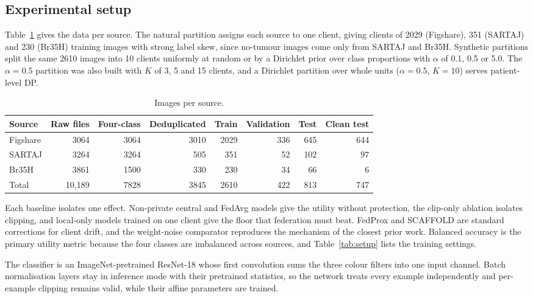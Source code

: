 \documentclass[preprint,12pt]{elsarticle}
\begin{document}
\subsection{Experimental setup}
Table~\ref{tab:data} gives the data per source. The natural partition assigns each source to one client, giving
clients of 2029 (Figshare), 351 (SARTAJ) and 230 (Br35H) training images with strong label skew, since no-tumour
images come only from SARTAJ and Br35H. Synthetic partitions split the same 2610 images into 10 clients uniformly at
random or by a Dirichlet prior over class proportions with $\alpha$ of 0.1, 0.5 or 5.0.\cite{hsu2019} The
$\alpha=0.5$ partition was also built with $K$ of 3, 5 and 15 clients, and a Dirichlet partition over whole units
($\alpha=0.5$, $K=10$) serves patient-level DP.

\begin{table}[htbp]
\caption{Images per source.}\label{tab:data}
\footnotesize\setlength{\tabcolsep}{4pt}
\begin{tabular*}{\linewidth}{@{\extracolsep{\fill}}lrrrrrrr@{}}
\toprule
Source & Raw files & Four-class & Deduplicated & Train & Validation & Test & Clean test\\
\midrule
Figshare & 3064 & 3064 & 3010 & 2029 & 336 & 645 & 644\\
SARTAJ & 3264 & 3264 & 505 & 351 & 52 & 102 & 97\\
Br35H & 3861 & 1500 & 330 & 230 & 34 & 66 & 6\\
Total & 10,189 & 7828 & 3845 & 2610 & 422 & 813 & 747\\
\bottomrule
\end{tabular*}
\end{table}

Each baseline isolates one effect. Non-private central and FedAvg models give the utility without protection, the
clip-only ablation isolates clipping, and local-only models trained on one client give the floor that federation
must beat. FedProx and SCAFFOLD are standard corrections for client drift, and the weight-noise comparator
reproduces the mechanism of the closest prior work. Balanced accuracy is the primary utility metric because the four
classes are imbalanced across sources, and Table~\ref{tab:setup} lists the training settings.

The classifier is an ImageNet-pretrained ResNet-18\cite{he2016} whose first convolution sums the three colour filters
into one input channel. Batch normalisation layers stay in inference mode with their pretrained statistics, so the
network treats every example independently and per-example clipping remains valid, while their affine parameters are
trained.
\end{document}
